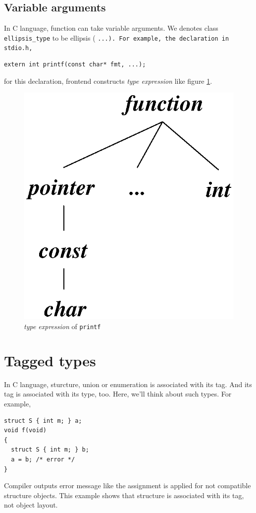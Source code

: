 \subsection{Variable arguments}
\label{type_e004}
In C language, function can take variable arguments.
We denotes class {\tt{ellipsis\_type}} to be ellipsis ( \tt{...}).
For example, the declaration in {\tt{stdio.h}},
\begin{verbatim}
extern int printf(const char* fmt, ...);
\end{verbatim}
for this declaration, frontend constructs {\em type expression}
like figure \ref{type_e009}.
\begin{figure}[htbp]
\begin{center}
\includegraphics[width=0.5\linewidth,height=0.5\linewidth]{ellipsis_type.eps}
\caption{{\em type expression} of {\tt{printf}}}
\label{type_e009}
\end{center}
\end{figure}

\section{Tagged types}
\label{type_e010}
In C language, sturcture, union or enumeration is
associated with its tag. And its tag is associated
with its type, too. Here, we'll think about such types.
For example,
\begin{verbatim}
struct S { int m; } a;
void f(void)
{
  struct S { int m; } b;
  a = b; /* error */
}
\end{verbatim}
Compiler outputs error message like the assignment is applied for 
not compatible structure objects. This example shows
that structure is associated with its tag, not object layout.

